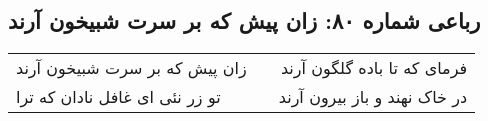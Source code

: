\begin{center}
\section*{رباعی شماره ۸۰: زان پیش که بر سرت شبیخون آرند}
\label{sec:sh080}
\begin{longtable}{l p{0.5cm} r}
زان پیش که بر سرت شبیخون آرند
&&
فرمای که تا باده گلگون آرند
\\
تو زر نئی ای غافل نادان که ترا
&&
در خاک نهند و باز بیرون آرند
\\
\end{longtable}
\end{center}
